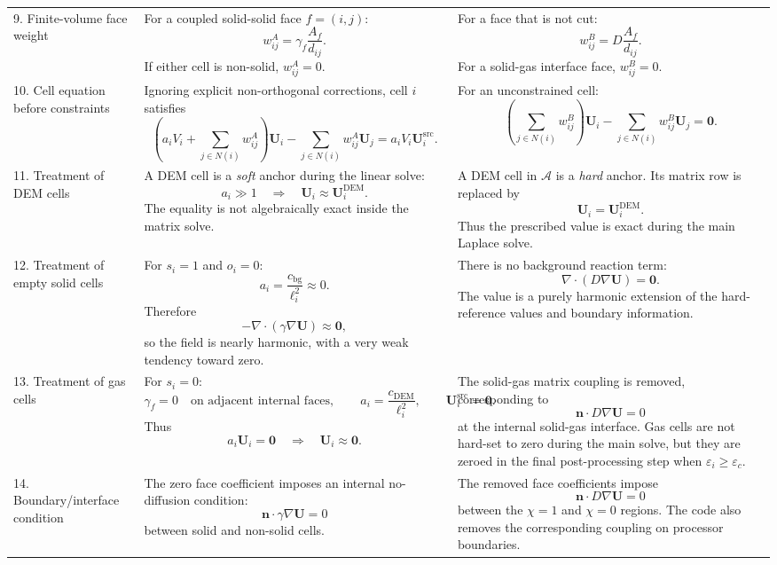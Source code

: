 \documentclass[11pt,a4paper]{article}
\newcommand{\U}{\bm{U}}
\newcommand{\Ud}{\bm{U}^{\mathrm{DEM}}}
\newcommand{\Usrc}{\bm{U}^{\mathrm{src}}}
\newcommand{\epsp}{\varepsilon}
\begin{document}
\begin{landscape}
\begin{longtable}{L{2.0cm}L{10.3cm}L{10.3cm}}
9. Finite-volume face weight
&
For a coupled solid-solid face $f=(i,j)$:
\[
w_{ij}^{A}
=
\gamma_f\frac{A_f}{d_{ij}}.
\]
If either cell is non-solid, $w_{ij}^{A}=0$.
&
For a face that is not cut:
\[
w_{ij}^{B}
=
D\frac{A_f}{d_{ij}}.
\]
For a solid-gas interface face, $w_{ij}^{B}=0$.
\\

10. Cell equation before constraints
&
Ignoring explicit non-orthogonal corrections, cell $i$ satisfies
\[
\left(
a_iV_i+\sum_{j\in N(i)}w_{ij}^{A}
\right)\U_i
-
\sum_{j\in N(i)}w_{ij}^{A}\U_j
=
a_iV_i\Usrc_i.
\tag{A-FV}
\]
&
For an unconstrained cell:
\[
\left(
\sum_{j\in N(i)}w_{ij}^{B}
\right)\U_i
-
\sum_{j\in N(i)}w_{ij}^{B}\U_j
=
\bm 0.
\tag{B-FV}
\]
\\

11. Treatment of DEM cells
&
A DEM cell is a \emph{soft} anchor during the linear solve:
\[
a_i\gg 1
\quad\Longrightarrow\quad
\U_i\approx\Ud_i.
\]
The equality is not algebraically exact inside the matrix solve.
&
A DEM cell in $\mathcal A$ is a \emph{hard} anchor. Its matrix row is replaced by
\[
\U_i=\Ud_i.
\]
Thus the prescribed value is exact during the main Laplace solve.
\\

12. Treatment of empty solid cells
&
For $s_i=1$ and $o_i=0$:
\[
a_i=\frac{c_{\mathrm{bg}}}{\ell_i^2}\approx0.
\]
Therefore
\[
-\nabla\cdot(\gamma\nabla\U)\approx\bm0,
\]
so the field is nearly harmonic, with a very weak tendency toward zero.
&
There is no background reaction term:
\[
\nabla\cdot(D\nabla\U)=\bm0.
\]
The value is a purely harmonic extension of the hard-reference values and boundary information.
\\

13. Treatment of gas cells
&
For $s_i=0$:
\[
\gamma_f=0
\quad\text{on adjacent internal faces},
\qquad
a_i=\frac{c_{\mathrm{DEM}}}{\ell_i^2},
\qquad
\Usrc_i=\bm0.
\]
Thus
\[
a_i\U_i=\bm0
\quad\Longrightarrow\quad
\U_i\approx\bm0.
\]
&
The solid-gas matrix coupling is removed, corresponding to
\[
\bm n\cdot D\nabla\U=0
\]
at the internal solid-gas interface. Gas cells are not hard-set to zero during the main solve, but they are zeroed in the final post-processing step when $\epsp_i\ge\epsp_c$.
\\

14. Boundary/interface condition
&
The zero face coefficient imposes an internal no-diffusion condition:
\[
\bm n\cdot\gamma\nabla\U=0
\]
between solid and non-solid cells.
&
The removed face coefficients impose
\[
\bm n\cdot D\nabla\U=0
\]
between the $\chi=1$ and $\chi=0$ regions. The code also removes the corresponding coupling on processor boundaries.
\\


\end{longtable}
\end{landscape}
\end{document}
